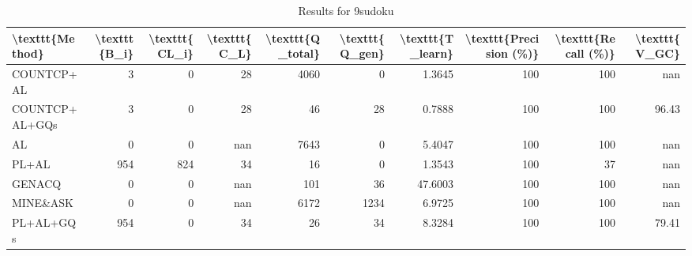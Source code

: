\begin{table}[ht]
\caption{Results for 9sudoku}
\begin{tabular}{lrrrrrrrrr}
\hline
 \textbackslash{}texttt\{Method\}   &   \textbackslash{}texttt\{B\_i\} &   \textbackslash{}texttt\{CL\_i\} &   \textbackslash{}texttt\{C\_L\} &   \textbackslash{}texttt\{Q\_total\} &   \textbackslash{}texttt\{Q\_gen\} &   \textbackslash{}texttt\{T\_learn\} &   \textbackslash{}texttt\{Precision (\%)\} &   \textbackslash{}texttt\{Recall (\%)\} &   \textbackslash{}texttt\{V\_GC\} \\
\hline
 COUNTCP+AL        &              3 &               0 &             28 &               4060 &                0 &             1.3645 &                      100 &                   100 &          nan    \\
 COUNTCP+AL+GQs    &              3 &               0 &             28 &                 46 &               28 &             0.7888 &                      100 &                   100 &           96.43 \\
 AL                &              0 &               0 &            nan &               7643 &                0 &             5.4047 &                      100 &                   100 &          nan    \\
 PL+AL             &            954 &             824 &             34 &                 16 &                0 &             1.3543 &                      100 &                    37 &          nan    \\
 GENACQ            &              0 &               0 &            nan &                101 &               36 &            47.6003 &                      100 &                   100 &          nan    \\
 MINE\&ASK          &              0 &               0 &            nan &               6172 &             1234 &             6.9725 &                      100 &                   100 &          nan    \\
 PL+AL+GQs         &            954 &               0 &             34 &                 26 &               34 &             8.3284 &                      100 &                   100 &           79.41 \\
\hline
\end{tabular}
\end{table}
